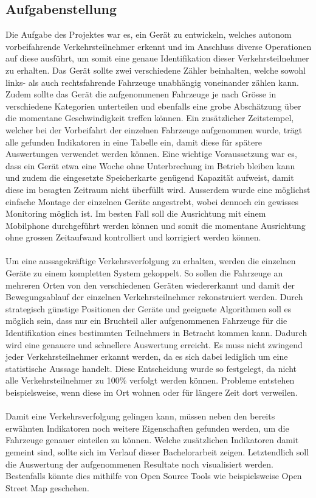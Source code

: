 \subsection{Aufgabenstellung}
Die Aufgabe des Projektes war es, ein Gerät zu entwickeln, welches autonom vorbeifahrende Verkehrsteilnehmer erkennt und im Anschluss diverse Operationen auf diese ausführt, um somit eine genaue Identifikation dieser Verkehrsteilnehmer zu erhalten. Das Gerät sollte zwei verschiedene Zähler beinhalten, welche sowohl links- als auch rechtsfahrende Fahrzeuge unabhängig voneinander zählen kann. Zudem sollte das Gerät die aufgenommenen Fahrzeuge je nach Grösse in verschiedene Kategorien unterteilen und ebenfalls eine grobe Abschätzung über die momentane Geschwindigkeit treffen können. Ein zusätzlicher Zeitstempel, welcher bei der Vorbeifahrt der einzelnen Fahrzeuge aufgenommen wurde, trägt alle gefunden Indikatoren in eine Tabelle ein, damit diese für spätere Auswertungen verwendet werden können. Eine wichtige Voraussetzung war es, dass ein Gerät etwa eine Woche ohne Unterbrechung im Betrieb bleiben kann und zudem die eingesetzte Speicherkarte genügend Kapazität aufweist, damit diese im besagten Zeitraum nicht überfüllt wird. Ausserdem wurde eine möglichst einfache Montage der einzelnen Geräte angestrebt, wobei dennoch ein gewisses Monitoring möglich ist. Im besten Fall soll die Ausrichtung mit einem Mobilphone durchgeführt werden können und somit die momentane Ausrichtung ohne grossen Zeitaufwand kontrolliert und korrigiert werden können.\\\\
Um eine aussagekräftige Verkehrsverfolgung zu erhalten, werden die einzelnen Geräte zu einem kompletten System gekoppelt. So sollen die Fahrzeuge an mehreren Orten von den verschiedenen Geräten wiedererkannt und damit der Bewegungsablauf der einzelnen Verkehrsteilnehmer rekonstruiert werden. Durch strategisch günstige Positionen der Geräte und geeignete Algorithmen soll es möglich sein, dass nur ein Bruchteil aller aufgenommenen Fahrzeuge für die Identifikation eines bestimmten Teilnehmers in Betracht kommen kann. Dadurch wird eine genauere und schnellere Auswertung erreicht. Es muss nicht zwingend jeder Verkehrsteilnehmer erkannt werden, da es sich dabei lediglich um eine statistische Aussage handelt. Diese Entscheidung wurde so festgelegt, da nicht alle Verkehrsteilnehmer zu 100\% verfolgt werden können. Probleme entstehen beispielsweise, wenn diese im Ort wohnen oder für längere Zeit dort verweilen.\\\\
Damit eine Verkehrsverfolgung gelingen kann, müssen neben den bereits erwähnten Indikatoren noch weitere Eigenschaften gefunden werden, um die Fahrzeuge genauer einteilen zu können. Welche zusätzlichen Indikatoren damit gemeint sind, sollte sich im Verlauf dieser Bachelorarbeit zeigen. Letztendlich soll die Auswertung der aufgenommenen Resultate noch visualisiert werden. Bestenfalls könnte dies mithilfe von Open Source Tools wie beispielsweise Open Street Map geschehen.